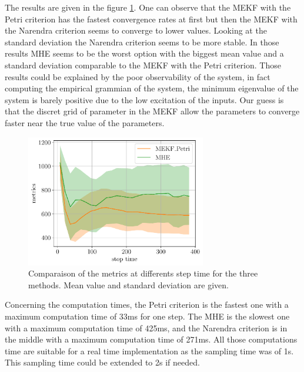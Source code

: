 The results are given in the figure \ref{fig:stats_comp}. One can observe that the MEKF with the Petri criterion has the fastest convergence rates at first but then the MEKF with the Narendra criterion seems to converge to lower values. Looking at the standard deviation the Narendra criterion seems to be more stable. In those results MHE seems to be the worst option with the biggest mean value and a standard deviation comparable to the MEKF with the Petri criterion. Those results could be explained by the poor observability of the system, in fact computing the empirical grammian of the system, the minimum eigenvalue of the system is barely positive due to the low excitation of the inputs. Our guess is that the discret grid of parameter in the MEKF allow the parameters to converge faster near the true value of the parameters.\medskip 

\begin{figure}
        \center
        \includegraphics[width=0.7\textwidth]{../figures/stats_comp.pdf}
        \caption{Comparaison of the metrics at differents step time for the three methods. Mean value and standard deviation are given.}
        \label{fig:stats_comp}
\end{figure}


Concerning the computation times, the Petri criterion is the fastest one with a maximum computation time of 33ms for one step. The MHE is the slowest one with a maximum computation time of 425ms, and the Narendra criterion is in the middle with a maximum computation time of 271ms. All those computations time are suitable for a real time implementation as the sampling time was of 1s. This sampling time could be extended to 2s if needed.\medskip


